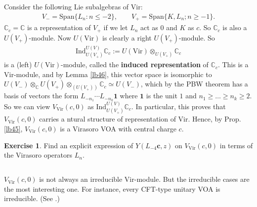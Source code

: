 \documentclass[12pt,a4paper,notitlepage]{article}
\theoremstyle{definition}
\newtheorem{exe}[df]{Exercise}
\theoremstyle{plain}
\newcommand{\id}{\mathbf{1}}
\newcommand{\Vir}{\mathrm{Vir}}
\newcommand{\Span}{\mathrm{Span}}
\newcommand{\Cbb}{\mathbb C}
\newcommand{\cbf}{\mathbf c}
\newcommand{\Ind}{\mathrm{Ind}}
\numberwithin{equation}{section}
\begin{document}
\subsection{}
Consider the following Lie subalgebras of $\Vir$:
\begin{align*}
V_-=\Span\{L_n:n\leq -2\},\qquad V_+=\Span\{K,L_n;n\geq -1\}.	
\end{align*}
$\Cbb_c=\Cbb$ is a representation of $V_+$ if we let $L_n$ act as $0$ and $K$ as $c$. So $\Cbb_c$ is also a $U(V_+)$-module. Now $U(\Vir)$ is clearly a right $U(V_+)$-module. So 
\begin{align*}
\Ind_{U(V_+)}^{U(V)}\Cbb_c:=	 U(\Vir)\otimes_{U(V_+)}\Cbb_c
\end{align*}
is a (left) $U(\Vir)$-module, called the \textbf{induced representation} of $\Cbb_c$. This is a $\Vir$-module, and by Lemma \ref{lb46}, this vector space is isomorphic to $U(V_-)\otimes_\Cbb U(V_+)\otimes_{(U(V_+))}\Cbb_c\simeq U(V_-)$, which by the PBW theorem has a basis of vectors the form $L_{-n_1}\cdots L_{-n_k}\id$ where $\id$ is the unit $1$ and $n_1\geq\dots\geq n_k\geq 2$. So we can view $V_\Vir(c,0)$ as $\Ind_{U(V_+)}^{U(V)}\Cbb_c$. In particular, this proves that $V_\Vir(c,0)$ carries a ntural structure of representation of $\Vir$. Hence, by Prop. \ref{lb45}, $V_\Vir(c,0)$ is a Virasoro VOA with central charge $c$.

\begin{exe}
Find an explicit expression of $Y(L_{-4}\cbf,z)$ on $V_\Vir(c,0)$ in terms of the Virasoro operators $L_n$.
\end{exe}


\subsection{}\label{lb47}


$V_\Vir(c,0)$ is not always an irreducible $\Vir$-module. But the irreducible cases are the most interesting one. For instance, every CFT-type unitary VOA is irreducible. (See \cite{CKLW18}.)
\end{document}
